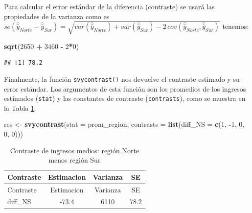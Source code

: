 \documentclass[
  spanish,
  12pt,
]{book}
\newenvironment{Shaded}{\begin{snugshade}}{\end{snugshade}}
\newcommand{\AttributeTok}[1]{\textcolor[rgb]{0.13,0.29,0.53}{#1}}
\newcommand{\DecValTok}[1]{\textcolor[rgb]{0.00,0.00,0.81}{#1}}
\newcommand{\FunctionTok}[1]{\textcolor[rgb]{0.13,0.29,0.53}{\textbf{#1}}}
\newcommand{\NormalTok}[1]{#1}
\newcommand{\OtherTok}[1]{\textcolor[rgb]{0.56,0.35,0.01}{#1}}
\newcommand{\SpecialCharTok}[1]{\textcolor[rgb]{0.81,0.36,0.00}{\textbf{#1}}}
\begin{document}
Para calcular el error estándar de la diferencia (contraste) se usará las propiedades de la varianza como es
\(se\left(\hat{\bar{y}}_{Norte}-\hat{\bar{y}}_{Sur}\right)=\sqrt{var\left(\hat{\bar{y}}_{Norte}\right)+var\left(\hat{\bar{y}}_{Sur}\right)-2\,cov\left(\hat{\bar{y}}_{Norte},\hat{\bar{y}}_{Sur}\right)}\) tenemos:

\begin{Shaded}
\begin{Highlighting}[]
\FunctionTok{sqrt}\NormalTok{(}\DecValTok{2650} \SpecialCharTok{+} \DecValTok{3460} \SpecialCharTok{{-}} \DecValTok{2}\SpecialCharTok{*}\DecValTok{0}\NormalTok{)}
\end{Highlighting}
\end{Shaded}

\begin{verbatim}
## [1] 78.2
\end{verbatim}

Finalmente, la función \texttt{svycontrast()} nos devuelve el contraste estimado y su error estándar. Los argumentos de esta función son los promedios de los ingresos estimados (\texttt{stat}) y las constantes de contraste (\texttt{contrasts}), como se muestra en la Tabla \ref{tab:tab-contraste-ns}.

\begin{Shaded}
\begin{Highlighting}[]
\NormalTok{res }\OtherTok{\textless{}{-}} \FunctionTok{svycontrast}\NormalTok{(}\AttributeTok{stat =}\NormalTok{ prom\_region,}
                   \AttributeTok{contrasts =} \FunctionTok{list}\NormalTok{(}\AttributeTok{diff\_NS =} \FunctionTok{c}\NormalTok{(}\DecValTok{1}\NormalTok{, }\SpecialCharTok{{-}}\DecValTok{1}\NormalTok{, }\DecValTok{0}\NormalTok{, }\DecValTok{0}\NormalTok{, }\DecValTok{0}\NormalTok{)))}
\end{Highlighting}
\end{Shaded}

\begin{longtable}[]{@{}lccc@{}}
\caption{\label{tab:tab-contraste-ns}Contraste de ingresos medios: región Norte menos región Sur}\tabularnewline
\toprule\noalign{}
Contraste & Estimacion & Varianza & SE \\
\midrule\noalign{}
\endfirsthead
\toprule\noalign{}
Contraste & Estimacion & Varianza & SE \\
\midrule\noalign{}
\endhead
\bottomrule\noalign{}
\endlastfoot
diff\_NS & -73.4 & 6110 & 78.2 \\
\end{longtable}
\end{document}
